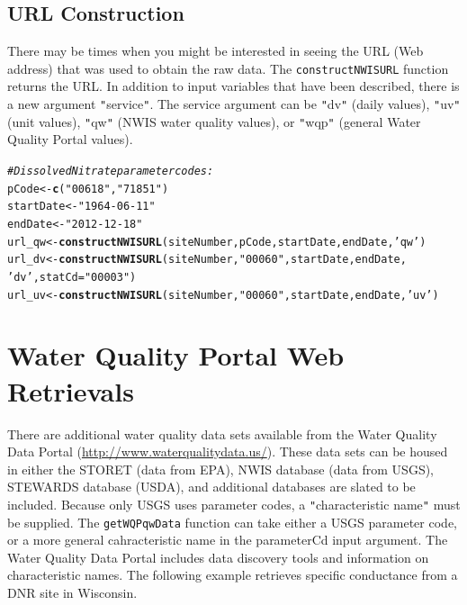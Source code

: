 \documentclass[a4paper,11pt]{article}\usepackage[]{graphicx}\usepackage[]{color}
\makeatletter
\newcommand{\hlstr}[1]{\textcolor[rgb]{0.192,0.494,0.8}{#1}}%
\newcommand{\hlcom}[1]{\textcolor[rgb]{0.678,0.584,0.686}{\textit{#1}}}%
\newcommand{\hlstd}[1]{\textcolor[rgb]{0.345,0.345,0.345}{#1}}%
\newcommand{\hlkwb}[1]{\textcolor[rgb]{0.69,0.353,0.396}{#1}}%
\newcommand{\hlkwc}[1]{\textcolor[rgb]{0.333,0.667,0.333}{#1}}%
\newcommand{\hlkwd}[1]{\textcolor[rgb]{0.737,0.353,0.396}{\textbf{#1}}}%
\newenvironment{kframe}{%
 \def\at@end@of@kframe{}%
 \ifinner\ifhmode%
  \def\at@end@of@kframe{\end{minipage}}%
  \begin{minipage}{\columnwidth}%
 \fi\fi%
 \def\FrameCommand##1{\hskip\@totalleftmargin \hskip-\fboxsep
 \colorbox{shadecolor}{##1}\hskip-\fboxsep
     \hskip-\linewidth \hskip-\@totalleftmargin \hskip\columnwidth}%
 \MakeFramed {\advance\hsize-\width
   \@totalleftmargin\z@ \linewidth\hsize
   \@setminipage}}%
 {\par\unskip\endMakeFramed%
 \at@end@of@kframe}
\newenvironment{knitrout}{}{} %
\makeatother
\begin{document}
\subsection{URL Construction}
\label{sec:usgsURL}
There may be times when you might be interested in seeing the URL (Web address) that was used to obtain the raw data. The \texttt{constructNWISURL} function returns the URL.  In addition to input variables that have been described, there is a new argument \texttt{"}service\texttt{"}. The service argument can be \texttt{"}dv\texttt{"} (daily values), \texttt{"}uv\texttt{"} (unit values), \texttt{"}qw\texttt{"} (NWIS water quality values), or \texttt{"}wqp\texttt{"} (general Water Quality Portal values).
 

\begin{knitrout}
\color{fgcolor}\begin{kframe}
\begin{alltt}
\hlcom{# Dissolved Nitrate parameter codes:}
\hlstd{pCode} \hlkwb{<-} \hlkwd{c}\hlstd{(}\hlstr{"00618"}\hlstd{,}\hlstr{"71851"}\hlstd{)}
\hlstd{startDate} \hlkwb{<-} \hlstr{"1964-06-11"}
\hlstd{endDate} \hlkwb{<-} \hlstr{"2012-12-18"}
\hlstd{url_qw} \hlkwb{<-} \hlkwd{constructNWISURL}\hlstd{(siteNumber,pCode,startDate,endDate,}\hlstr{'qw'}\hlstd{)}
\hlstd{url_dv} \hlkwb{<-} \hlkwd{constructNWISURL}\hlstd{(siteNumber,}\hlstr{"00060"}\hlstd{,startDate,endDate,}
                           \hlstr{'dv'}\hlstd{,}\hlkwc{statCd}\hlstd{=}\hlstr{"00003"}\hlstd{)}
\hlstd{url_uv} \hlkwb{<-} \hlkwd{constructNWISURL}\hlstd{(siteNumber,}\hlstr{"00060"}\hlstd{,startDate,endDate,}\hlstr{'uv'}\hlstd{)}
\end{alltt}
\end{kframe}
\end{knitrout}



\section{Water Quality Portal Web Retrievals}
\label{sec:usgsSTORET}
There are additional water quality data sets available from the Water Quality Data Portal (\url{http://www.waterqualitydata.us/}).  These data sets can be housed in either the STORET (data from EPA), NWIS database (data from USGS), STEWARDS database (USDA), and additional databases are slated to be included.  Because only USGS uses parameter codes, a \texttt{"}characteristic name\texttt{"} must be supplied.  The \texttt{getWQPqwData} function can take either a USGS parameter code, or a more general cahracteristic name in the parameterCd input argument. The Water Quality Data Portal includes data discovery tools and information on characteristic names. The following example retrieves specific conductance from a DNR site in Wisconsin. 
\end{document}
